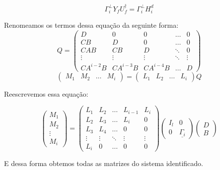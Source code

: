 \begin{equation}
\Gamma_i ^\perp Y_f U_f ^\dagger=\Gamma_i ^\perp H^d_i
\end{equation}

Renomeamos os termos dessa equação da seguinte forma:
\begin{equation}
Q=\begin{pmatrix}
D& 0 & 0 & \dots & 0\\
CB & D & 0 & \dots & 0\\
CAB & CB & D & \ddots & 0\\
\vdots & \vdots & \vdots & \ddots & \vdots\\
CA^{i-2}B & CA^{i-3}B & CA^{i-4}B& \dots & D
\end{pmatrix}
\end{equation}
\begin{equation}
\begin{pmatrix}
M_1 & M_2 & \dots & M_i
\end{pmatrix}
=
\begin{pmatrix}
L_1 & L_2 & \dots & L_i
\end{pmatrix}Q
\end{equation}

Reescrevemos essa equação:

\begin{equation} \label{eq:eqdb}
\begin{pmatrix}
M_1\\M_2\\ \vdots \\ M_i
\end{pmatrix}
=
\begin{pmatrix}
L_1 &L_2& \dots & L_{i-1}& L_i\\
L_2& L_3 & \dots & L_i & 0\\
L_3 & L_4 & \dots & 0 & 0\\
\vdots & \vdots & \ddots & \vdots & \vdots\\
L_i & 0 & \dots & 0 &0
\end{pmatrix}
\begin{pmatrix}
I_l & 0 \\ 0 & \underline{\Gamma_i}
\end{pmatrix}
\begin{pmatrix}
D \\ B
\end{pmatrix}
\end{equation}

E dessa forma obtemos todas as matrizes do sistema identificado.

